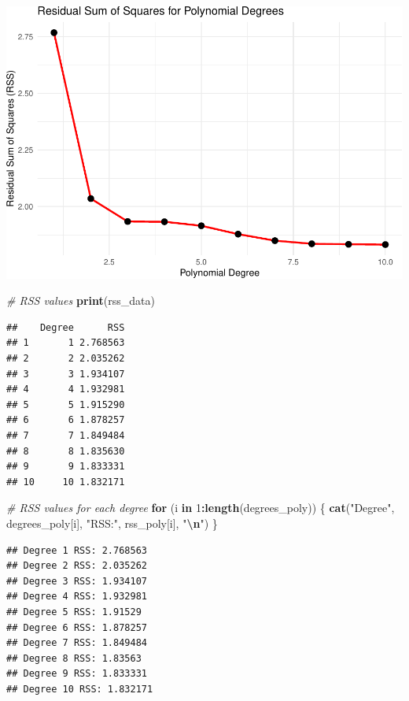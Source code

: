 \documentclass[
]{article}
\newenvironment{Shaded}{\begin{snugshade}}{\end{snugshade}}
\newcommand{\CommentTok}[1]{\textcolor[rgb]{0.56,0.35,0.01}{\textit{#1}}}
\newcommand{\ControlFlowTok}[1]{\textcolor[rgb]{0.13,0.29,0.53}{\textbf{#1}}}
\newcommand{\DecValTok}[1]{\textcolor[rgb]{0.00,0.00,0.81}{#1}}
\newcommand{\FunctionTok}[1]{\textcolor[rgb]{0.13,0.29,0.53}{\textbf{#1}}}
\newcommand{\NormalTok}[1]{#1}
\newcommand{\SpecialCharTok}[1]{\textcolor[rgb]{0.81,0.36,0.00}{\textbf{#1}}}
\newcommand{\StringTok}[1]{\textcolor[rgb]{0.31,0.60,0.02}{#1}}
\begin{document}
\includegraphics{chapter-07-hw_files/figure-latex/unnamed-chunk-5-1.pdf}

\begin{Shaded}
\begin{Highlighting}[]
\CommentTok{\# RSS values}
\FunctionTok{print}\NormalTok{(rss\_data)}
\end{Highlighting}
\end{Shaded}

\begin{verbatim}
##    Degree      RSS
## 1       1 2.768563
## 2       2 2.035262
## 3       3 1.934107
## 4       4 1.932981
## 5       5 1.915290
## 6       6 1.878257
## 7       7 1.849484
## 8       8 1.835630
## 9       9 1.833331
## 10     10 1.832171
\end{verbatim}

\begin{Shaded}
\begin{Highlighting}[]
\CommentTok{\# RSS values for each degree}
\ControlFlowTok{for}\NormalTok{ (i }\ControlFlowTok{in} \DecValTok{1}\SpecialCharTok{:}\FunctionTok{length}\NormalTok{(degrees\_poly)) \{}
  \FunctionTok{cat}\NormalTok{(}\StringTok{"Degree"}\NormalTok{, degrees\_poly[i], }\StringTok{"RSS:"}\NormalTok{, rss\_poly[i], }\StringTok{"}\SpecialCharTok{\textbackslash{}n}\StringTok{"}\NormalTok{)}
\NormalTok{\}}
\end{Highlighting}
\end{Shaded}

\begin{verbatim}
## Degree 1 RSS: 2.768563 
## Degree 2 RSS: 2.035262 
## Degree 3 RSS: 1.934107 
## Degree 4 RSS: 1.932981 
## Degree 5 RSS: 1.91529 
## Degree 6 RSS: 1.878257 
## Degree 7 RSS: 1.849484 
## Degree 8 RSS: 1.83563 
## Degree 9 RSS: 1.833331 
## Degree 10 RSS: 1.832171
\end{verbatim}
\end{document}
